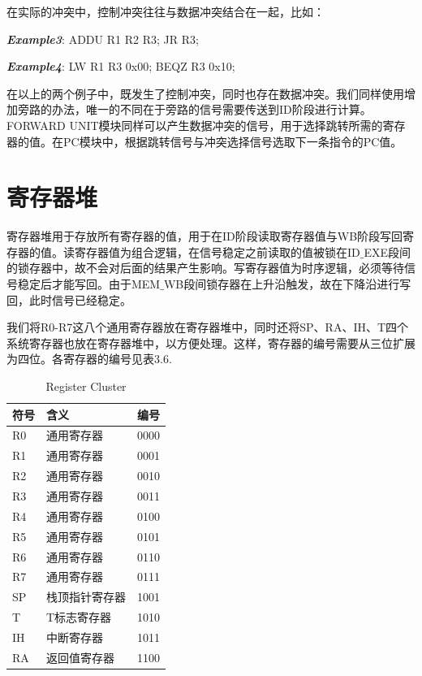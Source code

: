 在实际的冲突中，控制冲突往往与数据冲突结合在一起，比如：

\textbf{\textit{Example3}}: \quad ADDU R1 R2 R3; \quad JR R3;

\textbf{\textit{Example4}}: \quad LW R1 R3 0x00; \quad BEQZ R3 0x10;

在以上的两个例子中，既发生了控制冲突，同时也存在数据冲突。我们同样使用增加旁路的办法，唯一的不同在于旁路的信号需要传送到ID阶段进行计算。FORWARD UNIT模块同样可以产生数据冲突的信号，用于选择跳转所需的寄存器的值。在PC模块中，根据跳转信号与冲突选择信号选取下一条指令的PC值。


\section{寄存器堆}

寄存器堆用于存放所有寄存器的值，用于在ID阶段读取寄存器值与WB阶段写回寄存器的值。读寄存器值为组合逻辑，在信号稳定之前读取的值被锁在ID$\_$EXE段间的锁存器中，故不会对后面的结果产生影响。写寄存器值为时序逻辑，必须等待信号稳定后才能写回。由于MEM$\_$WB段间锁存器在上升沿触发，故在下降沿进行写回，此时信号已经稳定。

我们将R0-R7这八个通用寄存器放在寄存器堆中，同时还将SP、RA、IH、T四个系统寄存器也放在寄存器堆中，以方便处理。这样，寄存器的编号需要从三位扩展为四位。各寄存器的编号见表3.6.

\begin{table}[H]
\begin{center}
\renewcommand{\arraystretch}{1.3}
\small
\caption{Register Cluster}
\label{tab:treatments}
\begin{tabular}{|p{1.4cm}<{\centering}|p{3cm}<{\centering}|p{1.4cm}<{\centering}|}
\hline
符号 & 含义 & 编号 \\
\hline
R0 & 通用寄存器 & 0000 \\
\hline
R1 & 通用寄存器 & 0001 \\
\hline
R2 & 通用寄存器 & 0010 \\
\hline
R3 & 通用寄存器 & 0011 \\
\hline
R4 & 通用寄存器 & 0100 \\
\hline
R5 & 通用寄存器 & 0101 \\
\hline
R6 & 通用寄存器 & 0110 \\
\hline
R7 & 通用寄存器 & 0111 \\
\hline
SP & 栈顶指针寄存器 & 1001 \\
\hline
T & T标志寄存器 & 1010 \\
\hline
IH & 中断寄存器 & 1011 \\
\hline 
RA & 返回值寄存器 & 1100 \\
\hline
\end{tabular}
\end{center}
\end{table}


